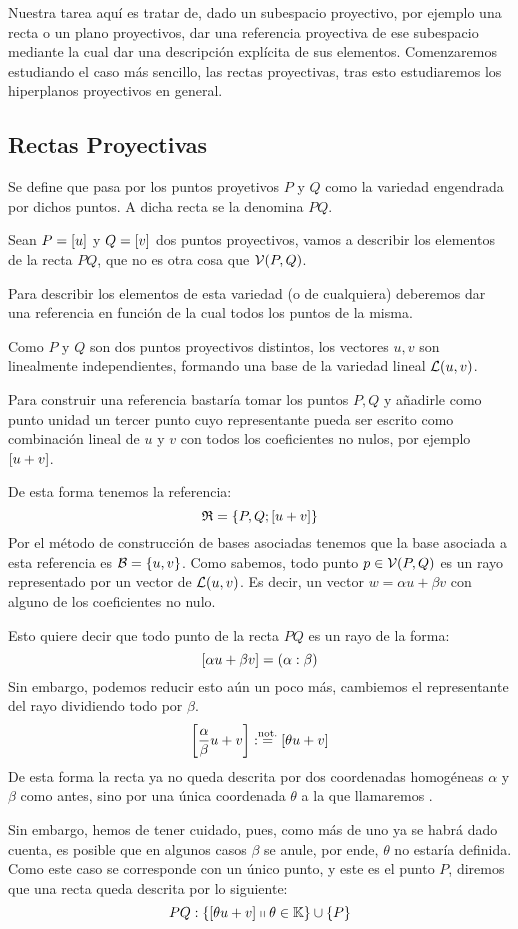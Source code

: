 Nuestra tarea aquí es tratar de, dado un subespacio proyectivo, por ejemplo una recta o un plano proyectivos, dar una referencia proyectiva de ese subespacio mediante la cual dar una descripción explícita de sus elementos. Comenzaremos estudiando el caso más sencillo, las rectas proyectivas, tras esto estudiaremos los hiperplanos proyectivos en general.
\subsection{Rectas Proyectivas}
\begin{defi}
	\label{C1_def_rectaProyectiva}
	Se define  que pasa por los puntos proyetivos $P$ y $Q$ como la variedad engendrada por dichos puntos. A dicha recta se la denomina  $PQ$.
\end{defi}
\begin{exa}
	\label{C1_exa_descripcionRecta}
	Sean $P=\left [ u \right ]$ y $Q=\left [ v \right ]$ dos puntos proyectivos, vamos a describir los elementos de la recta $PQ$, que no es otra cosa que $\mathcal{V}(P,Q)$.
	
	Para describir los elementos de esta variedad (o de cualquiera) deberemos dar una referencia en función de la cual  todos los puntos de la misma.
	
	Como $P$ y $Q$ son dos puntos proyectivos distintos, los vectores $u,v$ son linealmente independientes, formando una base de la variedad lineal $\mathcal{L}(u,v)$.
	
	Para construir una referencia bastaría tomar los puntos $P,Q$ y añadirle como punto unidad un tercer punto cuyo representante pueda ser escrito como combinación lineal de $u$ y $v$ con todos los coeficientes no nulos, por ejemplo $\left [ u+v \right ]$.
	
	De esta forma tenemos la referencia:
	\[\mathfrak{R}=\{P,Q;\left [ u+v \right ]\}\]
	Por el método de construcción de bases asociadas tenemos que la base asociada a esta referencia es $\mathcal{B}=\{u,v\}$. Como sabemos, todo punto $p\in\mathcal{V}(P,Q)$ es un rayo representado por un vector de $\mathcal{L}(u,v)$. Es decir, un vector $w=\alpha u+\beta v$ con alguno de los coeficientes no nulo.
	
	Esto quiere decir que todo punto de la recta $PQ$ es un rayo de la forma: \[\left [ \alpha u+\beta v \right ]=(\alpha:\beta)\]
	Sin embargo, podemos reducir esto aún un poco más, cambiemos el representante del rayo dividiendo todo por $\beta$.
	\[\left [ \frac{\alpha}{\beta}u+v \right ]:\stackrel{\textrm{not.}}{=}\left [ \theta u+v \right ]\]
	De esta forma la recta ya no queda descrita por dos coordenadas homogéneas $\alpha$ y $\beta$ como antes, sino por una única coordenada $\theta$ a la que llamaremos .
	
	Sin embargo, hemos de tener cuidado, pues, como más de uno ya se habrá dado cuenta, es posible que en algunos casos $\beta$ se anule, por ende, $\theta$ no estaría definida. Como este caso se corresponde con un único punto, y este es el punto $P$, diremos que una recta queda descrita por lo siguiente:
	\begin{equation}
	\label{C1_eq_descripcionRecta}
		PQ:\{\left [ \theta u+v \right ]\shortparallel \theta\in\mathbb{K}\}\cup\{P\}
	\end{equation}
\end{exa}
